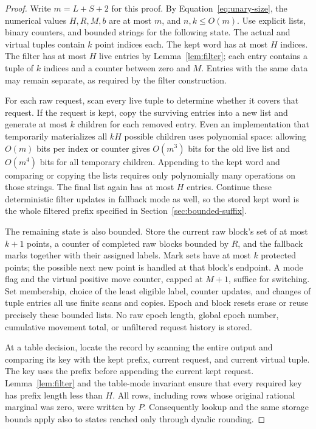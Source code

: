 \begin{proof}
Write $m=L+S+2$ for this proof.  By Equation~\eqref{eq:unary-size}, the numerical
values $H,R,M,b$ are at most $m$, and $n,k\le O(m)$.  Use explicit lists,
binary counters, and bounded strings for the following state.  The actual
and virtual tuples contain $k$ point indices each.  The kept word has at
most $H$ indices.  The filter has at most $H$ live entries by
Lemma~\ref{lem:filter}; each entry contains a tuple of $k$ indices and a
counter between zero and $M$.  Entries with the same data may remain
separate, as required by the filter construction.

For each raw request, scan every live tuple to determine whether it covers
that request.  If the request is kept, copy the surviving entries into a
new list and generate at most $k$ children for each removed entry.  Even an
implementation that temporarily materializes all $kH$ possible children
uses polynomial space: allowing $O(m)$ bits per index or counter gives
$O(m^3)$ bits for the old live list and $O(m^4)$ bits for all temporary
children.  Appending to the kept word and comparing or copying the lists
requires only polynomially many operations on those strings.  The final
list again has at most $H$ entries.  Continue these deterministic filter
updates in fallback mode as well, so the stored kept word is the whole
filtered prefix specified in Section~\ref{sec:bounded-suffix}.

The remaining state is also bounded.  Store the current raw block's set
of at most $k+1$ points, a counter of completed raw blocks bounded by
$R$, and the fallback marks together with their assigned labels.  Mark
sets have at most $k$ protected points; the possible next new point is
handled at that block's endpoint.  A mode flag and the virtual positive
move counter, capped at $M+1$, suffice for switching.  Set membership,
choice of the least eligible label, counter updates, and changes of tuple
entries all use finite scans and copies.  Epoch and block resets erase or
reuse precisely these bounded lists.  No raw epoch length, global epoch
number, cumulative movement total, or unfiltered request history is
stored.

At a table decision, locate the record by scanning the entire output and
comparing its key with the kept prefix, current request, and current
virtual tuple.  The key uses the prefix before appending the current kept
request.  Lemma~\ref{lem:filter} and the table-mode invariant ensure that
every required key has prefix length less than $H$.  All rows, including
rows whose original rational marginal was zero, were written by $P$.
Consequently lookup and the same storage bounds apply also to states
reached only through dyadic rounding.


\end{proof}
